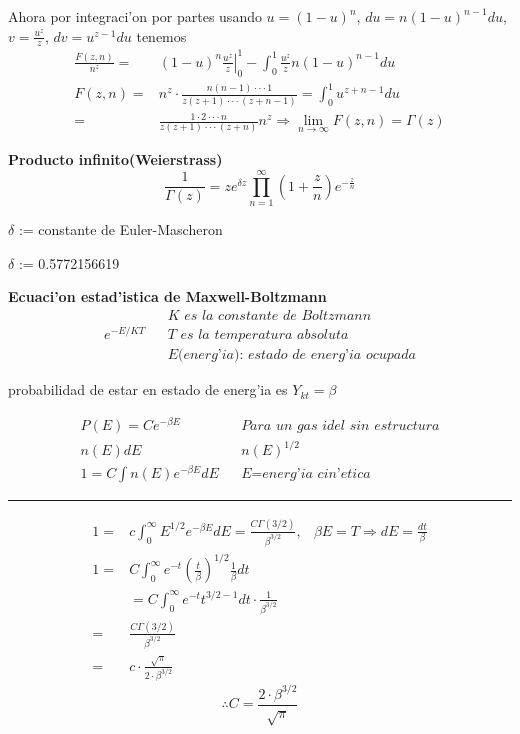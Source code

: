 \documentclass{article}
\theoremstyle{definition}
\begin{document}
Ahora por integraci'on por partes usando $u=(1-u)^n$, $du=n(1-u)^{n-1}du$, $v=\frac{u^z}{z}$, $dv=u^{z-1}du$ tenemos
\[
\begin{array}{rl}
	\frac{F(z,n)}{n^z}=& (1-u)^n \left.\frac{u^z}{z}\right|^1_0-\int^1_0\frac{u^z}{z} n(1-u)^{n-1}du\\
	F(z,n)=& n^z\cdot \frac{n(n-1)\cdot\cdot\cdot 1}{z(z+1)\cdot\cdot\cdot (z+n-1)}=\int^1_0u^{z+n-1}du\\
	=& \frac{1\cdot 2\cdot\cdot\cdot n}{z(z+1)\cdot\cdot\cdot (z+n)}n^z\Rightarrow\lim\limits_{n\to \infty}F(z,n)=\Gamma (z)
\end{array}\]

\textbf{Producto infinito(Weierstrass)}
\[\frac{1}{\Gamma (z)}= z e^{\delta z} \prod^{\infty}_{n=1}\left(1+\frac{z}{n}\right)e^{-\frac{z}{n}}\]
\begin{center}
	$\delta$ := constante de Euler-Mascheron
	
	$\delta$ := 0.5772156619
\end{center}

\textbf{Ecuaci'on estad'istica de Maxwell-Boltzmann}
\[\begin{array}{lcl}
	&& \textit{K es la constante de Boltzmann}\\
	e^{-E/KT} && \textit{T es la temperatura absoluta}\\
	&& \textit{E(energ'ia): estado de energ'ia ocupada}

\end{array}\]

probabilidad de estar en estado de energ'ia es $Y_{kt}=\beta$

\[\begin{array}{lcl}
	P(E)=Ce^{-\beta E} && \textit{Para un gas idel sin estructura}\\
	n(E)dE && n(E)^{1/2}\\
	1=C\int n(E) e^{-\beta E}dE && \textit{E=energ'ia cin'etica}
\end{array}\]
\par\noindent\rule{\textwidth}{0.5pt}
\[
\begin{array}{rlr}
	1=& c\int^{\infty}_0 E^{1/2}e^{-\beta E}dE=\frac{C\Gamma (3/2)}{\beta^{3/2}},& \beta E = T\Rightarrow dE=\frac{dt}{\beta}\\
	1=& C\int^{\infty}_0 e^{-t}\left(\frac{t}{\beta}\right)^{1/2}\frac{1}{\beta} dt\\
	&= C \int^{\infty}_0 e^{-t} t^{3/2-1}dt\cdot\frac{1}{\beta^{3/2}}\\
	=& \frac{C\Gamma (3/2)}{\beta^{3/2}}\\
	=& c\cdot\frac{\sqrt{\pi}}{2\cdot\beta^{3/2}}
\end{array}\]
\[\therefore C= \frac{2\cdot \beta^{3/2}}{\sqrt{\pi}}\]
\newpage
\end{document}
